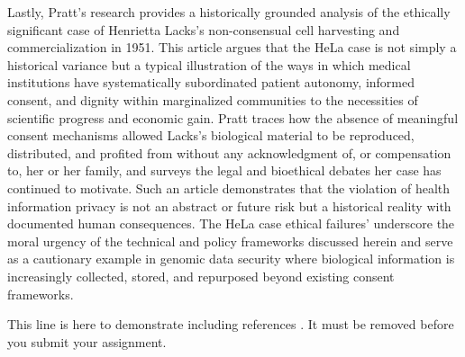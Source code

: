 \documentclass[12pt]{article}
\begin{document}
Lastly, Pratt's research provides a historically grounded analysis of the ethically significant case of Henrietta Lacks's non-consensual cell harvesting and commercialization in 1951. This article argues that the HeLa case is not simply a historical variance but a typical illustration of the ways in which medical institutions have systematically subordinated patient autonomy, informed consent, and dignity within marginalized communities to the necessities of scientific progress and economic gain. Pratt traces how the absence of meaningful consent mechanisms allowed Lacks's biological material to be reproduced, distributed, and profited from without any acknowledgment of, or compensation to, her or her family, and surveys the legal and bioethical debates her case has continued to motivate. Such an article demonstrates that the violation of health information privacy is not an abstract or future risk but a historical reality with documented human consequences. The HeLa case ethical failures’ underscore the moral urgency of the technical and policy frameworks discussed herein and serve as a cautionary example in genomic data security where biological information is increasingly collected, stored, and repurposed beyond existing consent frameworks.


This line is here to demonstrate including references \cite{hao-vizsec13}. It must be removed before you submit your assignment.
\end{document}
